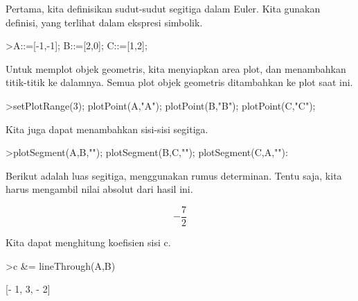 \documentclass[a4paper,10pt]{article}
\begin{document}
\begin{eulernotebook}
\begin{eulercomment}
\begin{eulercomment}
\begin{eulercomment}
\begin{eulercomment}
\begin{eulercomment}
\begin{eulercomment}
\begin{eulercomment}
\begin{eulercomment}
\begin{eulercomment}
\begin{eulercomment}
\begin{eulercomment}
\begin{eulercomment}
\begin{eulercomment}
\begin{eulercomment}
\begin{eulercomment}
\begin{eulercomment}
\begin{eulercomment}
\begin{eulercomment}
\begin{eulercomment}
Pertama, kita definisikan sudut-sudut segitiga dalam Euler. Kita
gunakan definisi, yang terlihat dalam ekspresi simbolik.
\end{eulercomment}
\begin{eulerprompt}
>A::=[-1,-1]; B::=[2,0]; C::=[1,2];
\end{eulerprompt}
\begin{eulercomment}
Untuk memplot objek geometris, kita menyiapkan area plot, dan
menambahkan titik-titik ke dalamnya. Semua plot objek geometris
ditambahkan ke plot saat ini.
\end{eulercomment}
\begin{eulerprompt}
>setPlotRange(3); plotPoint(A,"A"); plotPoint(B,"B"); plotPoint(C,"C");
\end{eulerprompt}
\begin{eulercomment}
Kita juga dapat menambahkan sisi-sisi segitiga.
\end{eulercomment}
\begin{eulerprompt}
>plotSegment(A,B,""); plotSegment(B,C,""); plotSegment(C,A,""):
\end{eulerprompt}
\begin{eulercomment}
Berikut adalah luas segitiga, menggunakan rumus determinan. Tentu
saja, kita harus mengambil nilai absolut dari hasil ini.
\end{eulercomment}
\begin{eulerformula}
\[
-\frac{7}{2}
\]
\end{eulerformula}
\begin{eulercomment}
Kita dapat menghitung koefisien sisi c.
\end{eulercomment}
\begin{eulerprompt}
>c &= lineThrough(A,B)
\end{eulerprompt}
\begin{euleroutput}
  
                              [- 1, 3, - 2]
  

\end{euleroutput}
\end{eulercomment}
\end{eulercomment}
\end{eulercomment}
\end{eulercomment}
\end{eulercomment}
\end{eulercomment}
\end{eulercomment}
\end{eulercomment}
\end{eulercomment}
\end{eulercomment}
\end{eulercomment}
\end{eulercomment}
\end{eulercomment}
\end{eulercomment}
\end{eulercomment}
\end{eulercomment}
\end{eulercomment}
\end{eulercomment}
\end{eulernotebook}
\end{document}
